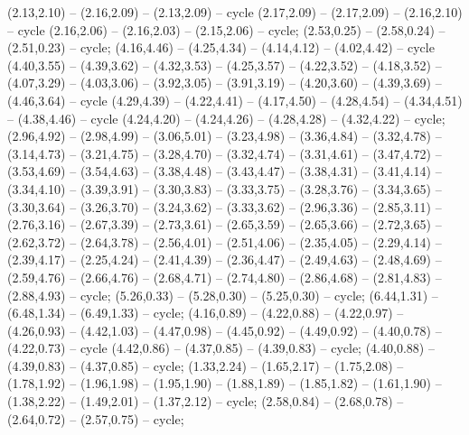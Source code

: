 { (2.13,2.10) -- (2.16,2.09) -- (2.13,2.09) -- cycle (2.17,2.09) -- (2.17,2.09) -- (2.16,2.10) -- cycle (2.16,2.06) -- (2.16,2.03) -- (2.15,2.06) -- cycle;
 (2.53,0.25) -- (2.58,0.24) -- (2.51,0.23) -- cycle;
 (4.16,4.46) -- (4.25,4.34) -- (4.14,4.12) -- (4.02,4.42) -- cycle (4.40,3.55) -- (4.39,3.62) -- (4.32,3.53) -- (4.25,3.57) -- (4.22,3.52) -- (4.18,3.52) -- (4.07,3.29) -- (4.03,3.06) -- (3.92,3.05) -- (3.91,3.19) -- (4.20,3.60) -- (4.39,3.69) -- (4.46,3.64) -- cycle (4.29,4.39) -- (4.22,4.41) -- (4.17,4.50) -- (4.28,4.54) -- (4.34,4.51) -- (4.38,4.46) -- cycle (4.24,4.20) -- (4.24,4.26) -- (4.28,4.28) -- (4.32,4.22) -- cycle;
 (2.96,4.92) -- (2.98,4.99) -- (3.06,5.01) -- (3.23,4.98) -- (3.36,4.84) -- (3.32,4.78) -- (3.14,4.73) -- (3.21,4.75) -- (3.28,4.70) -- (3.32,4.74) -- (3.31,4.61) -- (3.47,4.72) -- (3.53,4.69) -- (3.54,4.63) -- (3.38,4.48) -- (3.43,4.47) -- (3.38,4.31) -- (3.41,4.14) -- (3.34,4.10) -- (3.39,3.91) -- (3.30,3.83) -- (3.33,3.75) -- (3.28,3.76) -- (3.34,3.65) -- (3.30,3.64) -- (3.26,3.70) -- (3.24,3.62) -- (3.33,3.62) -- (2.96,3.36) -- (2.85,3.11) -- (2.76,3.16) -- (2.67,3.39) -- (2.73,3.61) -- (2.65,3.59) -- (2.65,3.66) -- (2.72,3.65) -- (2.62,3.72) -- (2.64,3.78) -- (2.56,4.01) -- (2.51,4.06) -- (2.35,4.05) -- (2.29,4.14) -- (2.39,4.17) -- (2.25,4.24) -- (2.41,4.39) -- (2.36,4.47) -- (2.49,4.63) -- (2.48,4.69) -- (2.59,4.76) -- (2.66,4.76) -- (2.68,4.71) -- (2.74,4.80) -- (2.86,4.68) -- (2.81,4.83) -- (2.88,4.93) -- cycle;
 (5.26,0.33) -- (5.28,0.30) -- (5.25,0.30) -- cycle;
 (6.44,1.31) -- (6.48,1.34) -- (6.49,1.33) -- cycle;
 (4.16,0.89) -- (4.22,0.88) -- (4.22,0.97) -- (4.26,0.93) -- (4.42,1.03) -- (4.47,0.98) -- (4.45,0.92) -- (4.49,0.92) -- (4.40,0.78) -- (4.22,0.73) -- cycle (4.42,0.86) -- (4.37,0.85) -- (4.39,0.83) -- cycle;
 (4.40,0.88) -- (4.39,0.83) -- (4.37,0.85) -- cycle;
 (1.33,2.24) -- (1.65,2.17) -- (1.75,2.08) -- (1.78,1.92) -- (1.96,1.98) -- (1.95,1.90) -- (1.88,1.89) -- (1.85,1.82) -- (1.61,1.90) -- (1.38,2.22) -- (1.49,2.01) -- (1.37,2.12) -- cycle;
 (2.58,0.84) -- (2.68,0.78) -- (2.64,0.72) -- (2.57,0.75) -- cycle;
}
